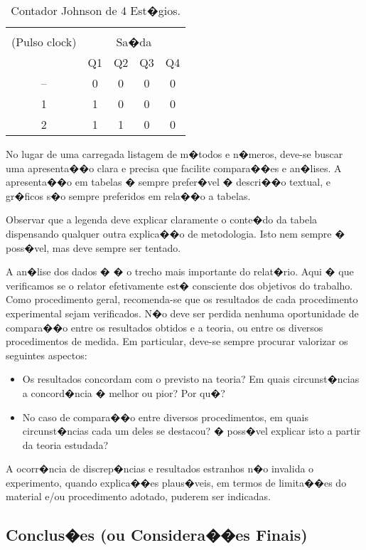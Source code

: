 \documentclass[conference]{IEEEtran}
\begin{document}
\begin{table}[!t]
\caption{Contador Johnson de 4 Est�gios.} \label{tab:tab}
\centering
\begin{tabular}{|c|c|c|c|c|}
\hline \\
(Pulso clock)	&  \multicolumn{4}{c}{Sa�da} \\ \hline
&	Q1 & 	Q2	& Q3 & Q4 \\ \hline
-- & 0 & 0 & 0 & 0 \\ \hline
1 & 1 & 0 & 0 & 0 \\ \hline
2 & 1 & 1 & 0 & 0 \\ \hline
\end{tabular} 
\end{table}

No lugar de uma carregada listagem de m�todos e n�meros, deve-se buscar uma apresenta��o clara e precisa que facilite compara��es e an�lises. A apresenta��o em tabelas � sempre prefer�vel � descri��o textual, e gr�ficos s�o sempre preferidos em rela��o a tabelas.

Observar que a legenda deve explicar claramente o conte�do da tabela dispensando qualquer outra explica��o de metodologia. Isto nem sempre � poss�vel, mas deve sempre ser tentado.

A an�lise dos dados � � o trecho mais importante do relat�rio. Aqui � que verificamos se o relator efetivamente est� consciente dos objetivos do trabalho. Como procedimento geral, recomenda-se que os resultados de cada procedimento experimental sejam verificados. N�o deve ser perdida nenhuma oportunidade de compara��o entre os resultados obtidos e a teoria, ou entre os diversos procedimentos de medida. Em particular, deve-se sempre procurar valorizar os seguintes aspectos:
\begin{itemize}
\item Os resultados concordam com o previsto na teoria? Em quais circunst�ncias a concord�ncia � melhor ou pior? Por qu�?
\item No caso de compara��o entre diversos procedimentos, em quais circunst�ncias cada um deles se destacou? � poss�vel explicar isto a partir da teoria estudada?
\end{itemize}

A ocorr�ncia de discrep�ncias e resultados estranhos n�o invalida o experimento, quando explica��es plaus�veis, em termos de limita��es do material e/ou procedimento adotado, puderem ser indicadas.

\subsection{Conclus�es (ou Considera��es Finais)}
\end{document}
